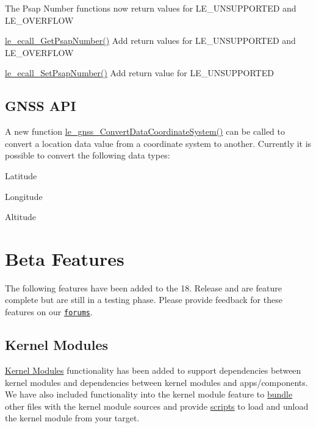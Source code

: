 The Psap Number functions now return values for L\+E\+\_\+\+U\+N\+S\+U\+P\+P\+O\+R\+T\+ED and L\+E\+\_\+\+O\+V\+E\+R\+F\+L\+OW
\begin{DoxyItemize}
\item \hyperlink{le__ecall__interface_8h_a959c53f03bb85f1071fcf7cb58e3067e}{le\+\_\+ecall\+\_\+\+Get\+Psap\+Number()} Add return values for L\+E\+\_\+\+U\+N\+S\+U\+P\+P\+O\+R\+T\+ED and L\+E\+\_\+\+O\+V\+E\+R\+F\+L\+OW
\item \hyperlink{le__ecall__interface_8h_abf9c09914c55cdbe72df1433f60f6e51}{le\+\_\+ecall\+\_\+\+Set\+Psap\+Number()} Add return value for L\+E\+\_\+\+U\+N\+S\+U\+P\+P\+O\+R\+T\+ED
\end{DoxyItemize}\hypertarget{releaseNotes18060_rn1806_Features_gnss}{}\subsection{G\+N\+S\+S A\+PI}\label{releaseNotes18060_rn1806_Features_gnss}
A new function \hyperlink{le__gnss__interface_8h_af32fd94e35e4df94b65c84740c5dbf42}{le\+\_\+gnss\+\_\+\+Convert\+Data\+Coordinate\+System()} can be called to convert a location data value from a coordinate system to another. Currently it is possible to convert the following data types\+:
\begin{DoxyItemize}
\item Latitude
\item Longitude
\item Altitude
\end{DoxyItemize}\hypertarget{releaseNotes18060_rn1806_BFeatures}{}\section{Beta Features}\label{releaseNotes18060_rn1806_BFeatures}
The following features have been added to the 18. Release and are feature complete but are still in a testing phase. Please provide feedback for these features on our \href{https://forum.legato.io/}{\tt forums}.\hypertarget{releaseNotes18060_rn1806_BFeatures_KernelModules}{}\subsection{Kernel Modules}\label{releaseNotes18060_rn1806_BFeatures_KernelModules}
\hyperlink{conceptsKernelModule}{Kernel Modules} functionality has been added to support dependencies between kernel modules and dependencies between kernel modules and apps/components. We have also included functionality into the kernel module feature to \hyperlink{defFilesMdef_defFilesMdef_bundles}{bundle} other files with the kernel module sources and provide \hyperlink{defFilesMdef_defFilesMdef_scripts}{scripts} to load and unload the kernel module from your target.

